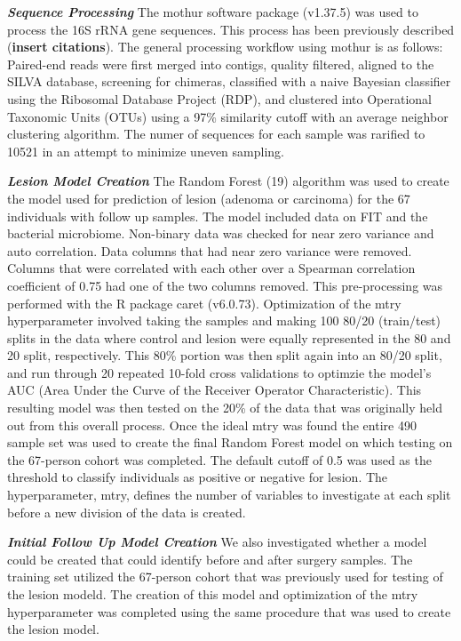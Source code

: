 \documentclass[12pt,]{article}
\begin{document}
\textbf{\emph{Sequence Processing}} The mothur software package
(v1.37.5) was used to process the 16S rRNA gene sequences. This process
has been previously described (\textbf{insert citations}). The general
processing workflow using mothur is as follows: Paired-end reads were
first merged into contigs, quality filtered, aligned to the SILVA
database, screening for chimeras, classified with a naive Bayesian
classifier using the Ribosomal Database Project (RDP), and clustered
into Operational Taxonomic Units (OTUs) using a 97\% similarity cutoff
with an average neighbor clustering algorithm. The numer of sequences
for each sample was rarified to 10521 in an attempt to minimize uneven
sampling.

\textbf{\emph{Lesion Model Creation}} The Random Forest (19) algorithm
was used to create the model used for prediction of lesion (adenoma or
carcinoma) for the 67 individuals with follow up samples. The model
included data on FIT and the bacterial microbiome. Non-binary data was
checked for near zero variance and auto correlation. Data columns that
had near zero variance were removed. Columns that were correlated with
each other over a Spearman correlation coefficient of 0.75 had one of
the two columns removed. This pre-processing was performed with the R
package caret (v6.0.73). Optimization of the mtry hyperparameter
involved taking the samples and making 100 80/20 (train/test) splits in
the data where control and lesion were equally represented in the 80 and
20 split, respectively. This 80\% portion was then split again into an
80/20 split, and run through 20 repeated 10-fold cross validations to
optimzie the model's AUC (Area Under the Curve of the Receiver Operator
Characteristic). This resulting model was then tested on the 20\% of the
data that was originally held out from this overall process. Once the
ideal mtry was found the entire 490 sample set was used to create the
final Random Forest model on which testing on the 67-person cohort was
completed. The default cutoff of 0.5 was used as the threshold to
classify individuals as positive or negative for lesion. The
hyperparameter, mtry, defines the number of variables to investigate at
each split before a new division of the data is created.

\textbf{\emph{Initial Follow Up Model Creation}} We also investigated
whether a model could be created that could identify before and after
surgery samples. The training set utilized the 67-person cohort that was
previously used for testing of the lesion modeld. The creation of this
model and optimization of the mtry hyperparameter was completed using
the same procedure that was used to create the lesion model.
\end{document}
